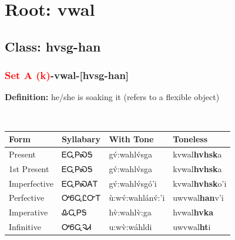\needspace{4in}
\section*{Root: vwal}
\nopagebreak
{}
\needspace{3in}
\subsection*{Class: hvsg-han}
\nopagebreak
\needspace{2in}
\subsubsection*{\textcolor{Red}{Set A (k)}{-}\textbf{vwal}{-}[hvsg-han]}
\nopagebreak
\textbf{Definition: } he/she is soaking it (refers to a flexible object)
\\[0.5em]
\begin{tabularx}{\textwidth}{l X X X}%
\toprule%
\textbf{Form}&\textbf{Syllabary}&\textbf{With Tone}&\textbf{Toneless}\\%
\midrule%
Present&ᎬᏩᏢᏍᎦ&gv́:wahlv́sga&kvwal\textbf{hvhsk}a\\%
1st Present&ᎬᏩᏢᏍᎦ&gv́:wahlv́sga&kvwal\textbf{hvhsk}a\\%
Imperfective&ᎬᏩᏢᏍᎪᎢ&gv́:wahlv́sgó’i&kvwal\textbf{hvhsk}o'i\\%
Perfective&ᎤᏮᏩᏝᏅᎢ&ù:wv́:wahlánv́:’i&uwvwal\textbf{han}v'i\\%
Imperative&ᎲᏩᏢᎦ&hv̀:wahlv̀:ga&hvwal\textbf{hvka}\\%
Infinitive&ᎤᏮᏩᎸᏗ&u:wv̀:wáhldi&uwvwal\textbf{ht}i\\%
\bottomrule%
\end{tabularx}
\\[1em]